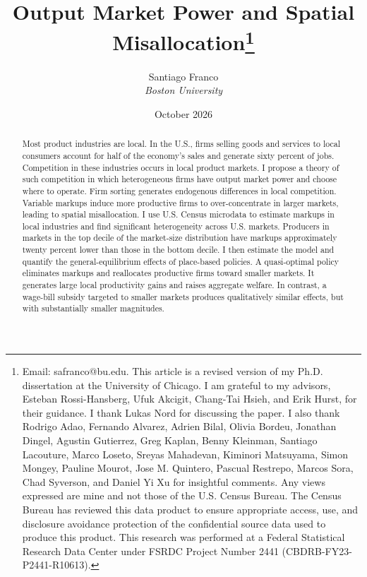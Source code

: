 


\makeatother

\title{\textbf{Output Market Power and Spatial Misallocation}\footnote{Email: safranco@bu.edu. This article is a revised version of my Ph.D. dissertation at the University of Chicago. I am grateful to my advisors, Esteban Rossi-Hansberg, Ufuk Akcigit, Chang-Tai Hsieh, and Erik Hurst, for their guidance. I thank Lukas Nord for discussing the paper. I also thank Rodrigo Adao, Fernando Alvarez, Adrien Bilal, Olivia Bordeu, Jonathan Dingel, Agustin Gutierrez, Greg Kaplan, Benny Kleinman, Santiago Lacouture, Marco Loseto, Sreyas Mahadevan, Kiminori Matsuyama, Simon Mongey, Pauline Mourot, Jose M. Quintero, Pascual Restrepo, Marcos Sora, Chad Syverson, and Daniel Yi Xu for insightful comments. Any views expressed are mine and not those of the U.S. Census Bureau. The Census Bureau has reviewed this data product to ensure appropriate access, use, and disclosure avoidance protection of the confidential source data used to produce this product. This research was performed at a Federal Statistical Research Data Center under FSRDC Project Number 2441 (CBDRB-FY23-P2441-R10613).}}

\author{Santiago Franco \\ \textit{Boston University}}



\date{October 2026}



\maketitle

\medskip


\thispagestyle{empty}

\medskip

\begin{abstract}
\noindent Most product industries are local. In the U.S., firms selling goods and services to local consumers account for half of the economy’s sales and generate sixty percent of jobs. Competition in these industries occurs in local product markets. I propose a theory of such competition in which heterogeneous firms have output market power and choose where to operate. Firm sorting generates endogenous differences in local competition. Variable markups induce more productive firms to over-concentrate in larger markets, leading to spatial misallocation. I use U.S. Census microdata to estimate markups in local industries and find significant heterogeneity across U.S. markets. Producers in markets in the top decile of the market-size distribution have markups approximately twenty percent lower than those in the bottom decile. I then estimate the model and quantify the general-equilibrium effects of place-based policies. A quasi-optimal policy eliminates markups and reallocates productive firms toward smaller markets. It generates large local productivity gains and raises aggregate welfare. In contrast, a wage-bill subsidy targeted to smaller markets produces qualitatively similar effects, but with substantially smaller magnitudes.
\end{abstract}

